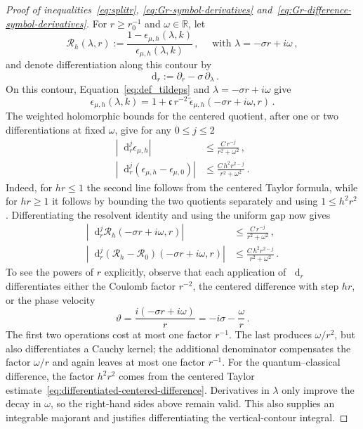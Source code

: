 \documentclass[a4paper,12pt]{amsart} %
\theoremstyle{plain}
\theoremstyle{definition}
\newcommand		{\RR}		{\mathbb R}			%
\newcommand		{\R}		{\RR}
\newcommand		{\lt}			{\left}				%
\newcommand		{\rt}			{\right}			%
\renewcommand	{\(}			{\lt(}
\renewcommand	{\)}			{\rt)}
\newcommand		{\n}[1]			{\lt\lvert{#1}\rt\rvert}	%
\renewcommand		{\d}		{\mathop{}\!\mathrm{d}}		%
\newcommand	{\h}			{h}
\newcommand		{\CK}			{\mathfrak{c}}	%
\begin{document}
\begin{proof}[Proof of inequalities~\eqref{eq:splitr}, \eqref{eq:Gr-symbol-derivatives} and~\eqref{eq:Gr-difference-symbol-derivatives}]
		For $r\geq r_0^{-1}$ and $\omega\in\R$, let
		\begin{equation*}
			\mathscr R_\h(\lambda,r) := \frac{1-\epsilon_{\mu,\h}(\lambda,k)}{\epsilon_{\mu,\h}(\lambda,k)} \, ,
			\quad
			\text{ with } \lambda = -\sigma r + i\omega \, ,
		\end{equation*}
		and denote differentiation along this contour by
		\begin{equation*}
			\d_r:=\partial_r-\sigma\, \partial_\lambda \, .
		\end{equation*}
		On this contour, Equation~\eqref{eq:def_tildeps} and $\lambda = -\sigma r+i\omega$ give
		\begin{equation*}
			\epsilon_{\mu,\h}(\lambda,k)
			=1 + \CK \, r^{-2} \, \widetilde\epsilon_{\mu,\h}(-\sigma r+i\omega,r) \, .
		\end{equation*}
		The weighted holomorphic bounds for the centered quotient, after one or two differentiations at fixed $\omega$, give for any $0\leq j\leq2$
		\begin{align*}
			\n{\d_r^j\epsilon_{\mu,\h}} &\leq\frac{C\,r^{-j}}{r^2+\omega^2} \, ,
			\\
			\n{\d_r^j(\epsilon_{\mu,\h}-\epsilon_{\mu,0})} &\leq\frac{C\,h^2r^{2-j}}{r^2+\omega^2} \, .
		\end{align*}
		Indeed, for $hr\leq1$ the second line follows from the centered Taylor formula, while for $hr\geq1$ it follows by bounding the two quotients separately and using $1\leq h^2r^2$. Differentiating the resolvent identity and using the uniform gap now gives
		\begin{align}\label{eq:high-resolvent-derivatives}
			\n{\d_r^j\mathscr R_\h(-\sigma r+i\omega,r)}
			&\leq\frac{C \, r^{-j}}{r^2+\omega^2} \, ,
			\\ \label{eq:high-resolvent-difference-derivatives}
			\n{\d_r^j(\mathscr R_\h-\mathscr R_0)(-\sigma r+i\omega,r)}
			&\leq\frac{C \, h^2r^{2-j}}{r^2+\omega^2} \,.
		\end{align}
		To see the powers of $r$ explicitly, observe that each application of $\d_r$ differentiates either the Coulomb factor $r^{-2}$, the centered difference with step $hr$, or the phase velocity
		\begin{equation*}
			\vartheta=\frac{i(-\sigma r+i\omega)}r = -i\sigma-\frac{\omega}{r} \, .
		\end{equation*}
		The first two operations cost at most one factor $r^{-1}$. The last produces $\omega/r^2$, but also differentiates a Cauchy kernel; the additional denominator compensates the factor $\omega/r$ and again
		leaves at most one factor $r^{-1}$. For the quantum--classical difference, the factor $h^2r^2$ comes from the centered Taylor estimate~\eqref{eq:differentiated-centered-difference}. Derivatives in $\lambda$ only improve the decay in $\omega$, so the right-hand
		sides above remain valid. This also supplies an integrable majorant and justifies differentiating the vertical-contour integral.


\end{proof}
\end{document}
